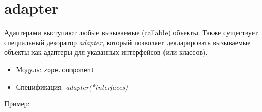 \documentclass[a4paper,openany,twoside,draft]{book}
\providecommand*{\DUroletitlereference}[1]{\textsl{#1}}
\begin{document}
\section*{adapter%
  \label{id55}%
}

Адаптерами выступают любые вызываемые (callable) объекты.  Также
существует специальный декоратор \DUroletitlereference{adapter}, который позволяет
декларировать вызываемые объекты как адаптеры для указанных
интерфейсов (или классов).

\begin{itemize}

\item Модуль: \texttt{zope.component}

\item Спецификация: \DUroletitlereference{adapter(*interfaces)}

\end{itemize}

Пример:
\end{document}
